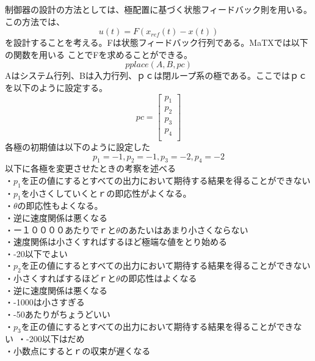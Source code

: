 \documentclass{jarticle}
\begin{document}
\begin{enumerate}
\begin{enumerate}
\begin{enumerate}
					
					制御器の設計の方法としては、極配置に基づく状態フィードバック則を用いる。この方法では、
					\begin{equation}
						u(t) = F(x_{ref}(t) - x(t))
					\end{equation}
					を設計することを考える。Fは状態フィードバック行列である。MaTXでは以下の関数を用いる
					ことでFを求めることができる。
					\[pplace(A, B, pc)\]
					Aはシステム行列、Bは入力行列、ｐｃは閉ループ系の極である。ここではｐｃを以下のように設定する。
					\begin{equation}
						pc=\left[
						\begin{array}{c}
							p_{1}\\
							p_{2}\\
							p_{3}\\
							p_{4}\\
						\end{array}
						\right]
					\end{equation}
					各極の初期値は以下のように設定した
					\[ p_{1}=-1,p_{2}=-1,p_{3}=-2,p_{4}=-2\]
					以下に各極を変更させたときの考察を述べる\\
					
					・$p_{1}$を正の値にするとすべての出力において期待する結果を得ることができない\\
					・$p_{1}$を小さくしていくとｒの即応性がよくなる。\\
					・$\theta$の即応性もよくなる。\\
					・逆に速度関係は悪くなる\\
					・ー１００００あたりでｒと$\theta$のあたいはあまり小さくならない\\
					・速度関係は小さくすればするほど極端な値をとり始める\\
					・-20以下でよい\\
					
					・$p_{2}$を正の値にするとすべての出力において期待する結果を得ることができない\\
					・小さくすればするほどｒと$\theta$の即応性はよくなる\\
					・逆に速度関係は悪くなる\\
					・-1000は小さすぎる\\
					・-50あたりがちょうどいい\\
					
					・$p_{3}$を正の値にするとすべての出力において期待する結果を得ることができない\
					・-200以下はだめ\\
					・小数点にするとｒの収束が遅くなる\\
					

\end{enumerate}
\end{enumerate}
\end{enumerate}
\end{document}
